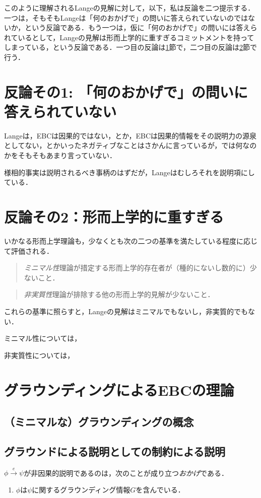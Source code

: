 \documentclass[dvipdfmx,twoside,11pt,uplatex]{jsarticle}
\theoremstyle{definition}
\begin{document}
このように理解されるLangeの見解に対して，以下，私は反論を二つ提示する．一つは，そもそもLangeは「何のおかげで」の問いに答えられていないのではないか，という反論である．もう一つは，仮に「何のおかげで」の問いには答えられているとして，Langeの見解は形而上学的に重すぎるコミットメントを持ってしまっている，という反論である．一つ目の反論は\ref{firstobjection}節で，二つ目の反論は\ref{secondobjection}節で行う．

\section{反論その1: 「何のおかげで」の問いに答えられていない}\label{firstobjection}

Langeは，EBCは因果的ではない，とか，EBCは因果的情報をその説明力の源泉としてない，とかいったネガティブなことはさかんに言っている\citep{Lange2013a}が，では何なのかをそもそもあまり言っていない．

様相的事実は説明されるべき事柄のはずだが，Langeはむしろそれを説明項にしている．

\section{反論その2：形而上学的に重すぎる}\label{secondobjection}

いかなる形而上学理論も，少なくとも次の二つの基準を満たしている程度に応じて評価される．
\begin{quote}
    \emph{ミニマル性}\quad 理論が措定する形而上学的存在者が（種的にないし数的に）少ないこと．
\end{quote}

\begin{quote}
    \emph{非実質性}\quad 理論が排除する他の形而上学的見解が少ないこと．
\end{quote}
これらの基準に照らすと，Langeの見解はミニマルでもないし，非実質的でもない．

ミニマル性については，

非実質性については，

\section{グラウンディングによるEBCの理論}

\subsection{（ミニマルな）グラウンディングの概念}

\subsection{グラウンドによる説明としての制約による説明}
$\phi\xrightarrow{e}\psi$が非因果的説明であるのは，次のことが成り立つ\emph{おかげ}である．
	\begin{enumerate}
	\item $\phi$は$\psi$に関するグラウンディング情報$G$を含んでいる．
	\end{enumerate}
\end{document}
